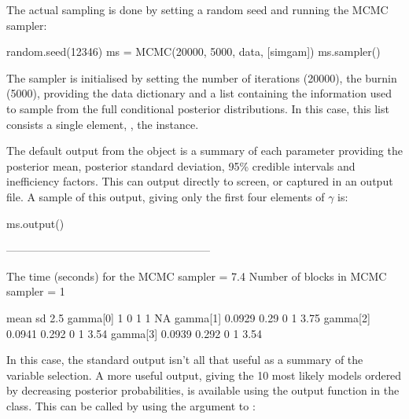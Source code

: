 \documentclass[article]{jss}
\begin{document}
The actual sampling is done by setting a random seed and running the
MCMC sampler:
\begin{Code}
random.seed(12346)
ms = MCMC(20000, 5000, data, [simgam])
ms.sampler()
\end{Code}

The  sampler is initialised by setting the number of
iterations (20000), the burnin (5000), providing the data dictionary
 and a list containing the information used to sample from
the full conditional posterior distributions. In this case, this list
consists a single element, , the 
instance.

The default output from the  object is a summary of each
parameter providing the posterior mean, posterior standard deviation,
95\% credible intervals and inefficiency factors. This can output
directly to screen, or captured in an output file. A sample of this
output, giving only the first four elements of $\gamma$ is:

\begin{CodeChunk}
\begin{CodeInput}
ms.output()
\end{CodeInput}
\begin{CodeOutput}
--------------------------------------------------------

The time (seconds) for the MCMC sampler =  7.4
Number of blocks in MCMC sampler =  1

                    mean          sd         2.5%
    gamma[0]           1           0            1           1         NA
    gamma[1]      0.0929        0.29            0           1         3.75
    gamma[2]      0.0941       0.292            0           1         3.54
    gamma[3]      0.0939       0.292            0           1         3.54
\end{CodeOutput}
\end{CodeChunk}

In this case, the standard output isn't all that useful as a summary
of the variable selection. A more useful output, giving the 10 most
likely models ordered by decreasing posterior probabilities, is
available using the output function in the 
class. This can be called by using the  argument to
:
\end{document}
